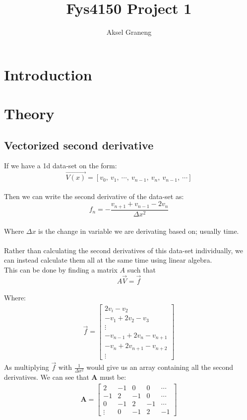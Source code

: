 \documentclass[a4paper,12pt,norsk]{article}
\title{Fys4150 Project 1}
\author{Aksel Graneng}
\begin{document}
\maketitle


\section{Introduction}

\section{Theory}

\subsection{Vectorized second derivative}

	If we have a 1d data-set on the form:
	$$\vec{V(x)} = [v_0,\ v_1,\ \cdots,\ v_{n-1},\ v_{n},\ v_{n-1},\ \cdots] $$\\
	Then we can write the second derivative of the data-set as:
	$$f_n = -\frac{v_{n+1} + v_{n-1} - 2v_n}{\Delta x^2} $$\\
	Where $\Delta x$ is the change in variable we are derivating based on; usually time.\\
	\\
	Rather than calculating the second derivatives of this data-set individually, we can instead calculate them all at the same time using linear algebra.\\
	This can be done by finding a matrix $A$ such that
	$$A\vec{V} = \vec{f} $$\\
	Where:
	\begin{gather*}
	\vec{f} = \left[
	\begin{array}{c}
	2v_i - v_2\\
	-v_1 + 2v_2 - v_3\\
	\vdots\\
	-v_{n-1} + 2v_n -v_{n+1}\\
	-v_n + 2v_{n+1} - v_{n+2}\\
	\vdots
	\end{array}
	\right]
	\end{gather*}
	As multiplying $\vec{f}$ with $\frac{1}{\Delta x^2}$ would give us an array containing all the second derivatives. We can see that $\textbf{A}$ must be:
	\begin{gather*}
	\textbf{A} = \left[
	\begin{array}{ccccc}
	2 & -1 & 0 & 0 & \cdots\\
	-1 & 2 & -1 & 0 & \cdots\\
	0 & -1 & 2 & -1 & \cdots\\
	\vdots & 0 & -1 & 2 & -1
	\end{array}
	\right]
	\end{gather*}
\end{document}
